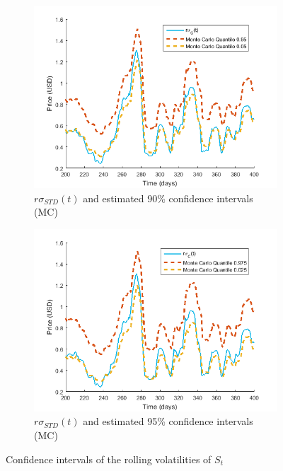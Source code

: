 \documentclass[11pt,a4,twosided,singlespacing,titlepagenumber=on]{scrreprt}
\numberwithin{equation}{chapter} %
\theoremstyle{remark}
\begin{document}
\begin{figure}[H]
\begin{subfigure}[t]{0.49\textwidth}
        \centering
        \includegraphics[width=1\textwidth]{model_vol/4}
        \caption{$r\sigma_{STD}(t)$ and estimated 90\% confidence intervals (MC)}
        \label{vol_mod_4}
    \end{subfigure}
    \begin{subfigure}[t]{0.49\textwidth}
        \centering
        \includegraphics[width=1\textwidth]{model_vol/4_2}
        \caption{$r\sigma_{STD}(t)$ and estimated 95\% confidence intervals (MC)}
        \label{vol_mod_4}
    \end{subfigure}
    \caption{Confidence intervals of the rolling volatilities of $S_t$}
    \label{fig:rolling_vol_and_confidence_intervals}
\end{figure}
\end{document}
